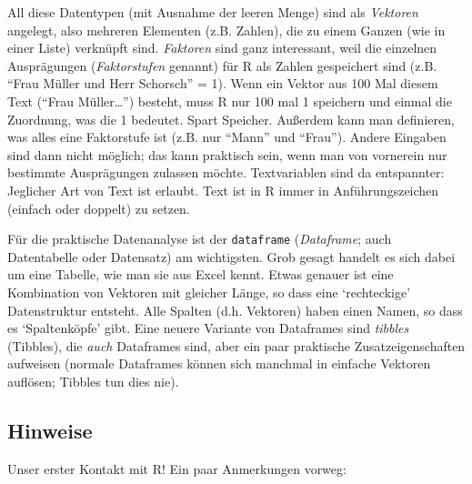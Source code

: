 \documentclass[12pt,ngerman,]{book}
\theoremstyle{definition}
\theoremstyle{definition}
\theoremstyle{remark}
\begin{document}
All diese Datentypen (mit Ausnahme der leeren Menge) sind als
\emph{Vektoren} angelegt, also mehreren Elementen (z.B.
Zahlen), die zu einem Ganzen (wie in einer Liste) verknüpft sind.
\emph{Faktoren} sind ganz interessant, weil die einzelnen Ausprägungen
(\emph{Faktorstufen} genannt) für R als Zahlen
gespeichert sind (z.B. ``Frau Müller und Herr Schorsch'' = 1). Wenn ein
Vektor aus 100 Mal diesem Text (``Frau Müller\ldots{}'') besteht, muss R
nur 100 mal 1 speichern und einmal die Zuordnung, was die 1 bedeutet.
Spart Speicher. Außerdem kann man definieren, was alles eine Faktorstufe
ist (z.B. nur ``Mann'' und ``Frau''). Andere Eingaben sind dann nicht
möglich; das kann praktisch sein, wenn man von vornerein nur bestimmte
Ausprägungen zulassen möchte. Textvariablen sind da entspannter:
Jeglicher Art von Text ist erlaubt. Text ist in R immer in
Anführungszeichen (einfach oder doppelt) zu setzen.

Für die praktische Datenanalyse ist der \texttt{dataframe}
(\emph{Dataframe}; auch Datentabelle
oder Datensatz) am wichtigsten. Grob gesagt handelt es
sich dabei um eine Tabelle, wie man sie aus Excel kennt. Etwas genauer
ist eine Kombination von Vektoren mit gleicher Länge, so dass eine
`rechteckige' Datenstruktur entsteht. Alle Spalten (d.h. Vektoren) haben
einen Namen, so dass es `Spaltenköpfe' gibt. Eine neuere Variante von
Dataframes sind \emph{tibbles} (Tibbles), die \emph{auch}
Dataframes sind, aber ein paar praktische Zusatzeigenschaften aufweisen
(normale Dataframes können sich manchmal in einfache Vektoren auflösen;
Tibbles tun dies nie).

\subsection{Hinweise}\label{hinweise}

Unser erster Kontakt mit R! Ein paar Anmerkungen vorweg:
\end{document}
